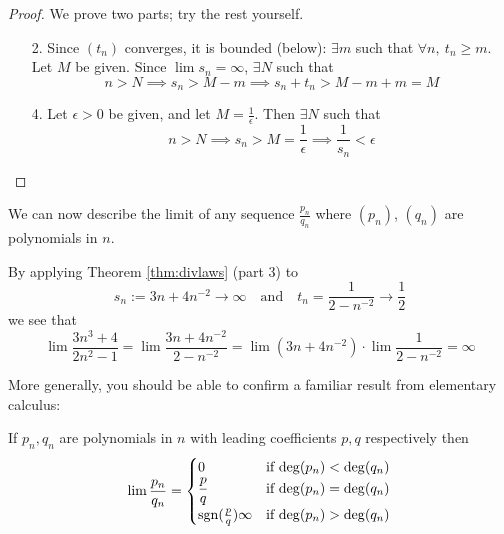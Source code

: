 \begin{proof}
	We prove two parts; try the rest yourself.
	\begin{enumerate}
		\item[2.] Since $(t_n)$ converges, it is bounded (below): $\exists m$ such that $\forall n,\ t_n\ge m$. Let $M$ be given. Since $\lim s_n=\infty$, $\exists N$ such that
		\[
			n>N\implies s_n>M-m \implies s_n+t_n>M-m+m=M
		\]
		\item[4.] Let $\epsilon>0$ be given, and let $M=\frac 1\epsilon$. Then $\exists N$ such that
		\[
			n>N\implies s_n>M=\frac 1\epsilon\implies \frac 1{s_n}<\epsilon\tag*{\qedhere}
		\]
	\end{enumerate}
\end{proof}



We can now describe the limit of any sequence $\frac{p_n}{q_n}$ where $(p_n)$, $(q_n)$ are polynomials in $n$.

\begin{example}{}{}
	By applying Theorem \ref{thm:divlaws} (part 3) to
	\[
		s_n:=3n+4n^{-2}\to\infty\quad \text{and}\quad t_n=\frac 1{2-n^{-2}}\to\frac 12
	\]
	we see that
	\[
		\lim\frac{3n^3+4}{2n^2-1}=\lim\frac{3n+4n^{-2}}{2-n^{-2}}=\lim(3n+4n^{-2})\cdot\lim \frac 1{2-n^{-2}} =\infty
	\]
\end{example}

More generally, you should be able to confirm a familiar result from elementary calculus:

\begin{cor}{}{}
	If $p_n,q_n$ are polynomials in $n$ with leading coefficients $p,q$ respectively then
	\[
		\lim\frac{p_n}{q_n}=
		\begin{cases}
			0&\text{if $\operatorname{deg}(p_n)<\operatorname{deg}(q_n)$}\\
			\dfrac pq&\text{if $\operatorname{deg}(p_n)=\operatorname{deg}(q_n)$}\\
			\mathrm{sgn}(\frac pq)\infty&\text{if $\operatorname{deg}(p_n)>\operatorname{deg}(q_n)$}
		\end{cases}
	\]
\end{cor}


\goodbreak



